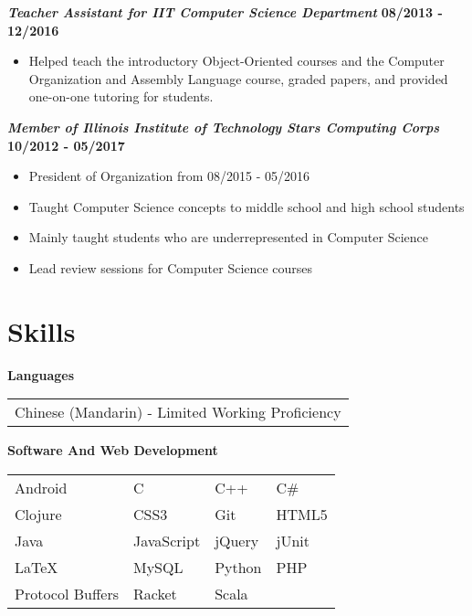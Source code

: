 \documentclass[10pt]{res}
\begin{document}
\begin{resume}
	\textbf{\textit{Teacher Assistant for IIT Computer Science Department}} 
	\vspace*{.25em}
	\hfill {\bf 08/2013 - 12/2016}
	\begin{itemize}
	  \item Helped teach the introductory Object-Oriented courses and the Computer Organization and Assembly Language course, graded papers, and provided one-on-one tutoring for students. 
	\end{itemize}
	
	\textbf{\textit{Member of Illinois Institute of Technology Stars Computing Corps}}
	\vspace*{.25em}
	\hfill {\bf 10/2012 - 05/2017}
	\begin{itemize}
  \setlength\itemsep{0em}
	  \item President of Organization from 08/2015 - 05/2016
	  \item Taught Computer Science concepts to middle school and high school students  
	  \item Mainly taught students who are underrepresented in Computer Science 
	  \item Lead review sessions for Computer Science courses 
	\end{itemize}
	
\section{Skills}
\textbf{Languages} \\ 
	\begin{tabular}{ l }
		Chinese (Mandarin) - Limited Working Proficiency
	\end{tabular}
	
	\vspace{1pt}
\textbf{Software And Web Development} \\
	\begin{tabular}{  l    l    l    l  }
		Android	           &   C 	     			&    C++ 			&   C\# 	\\ 
		Clojure 			& 	CSS3 	 		& 	Git	 			& 	HTML5  \\
	     Java  				& 	JavaScript 		&	jQuery            &   jUnit  	 \\
		LaTeX   			&   MySQL 			&	Python       	&	PHP  	 \\	   
  	 	Protocol Buffers   	& 	Racket         	&	Scala			&				
	\end{tabular}
\end{resume}
\end{document}
